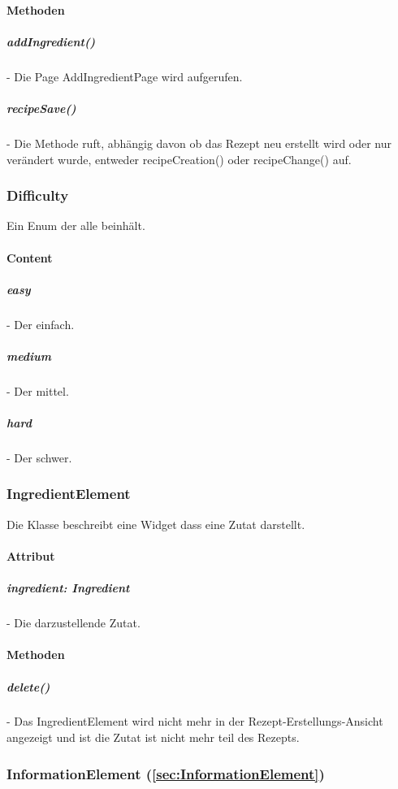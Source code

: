 \documentclass[parskip=full]{scrartcl}
\begin{document}
            \paragraph*{Methoden}
                \subparagraph*{addIngredient()} - Die Page AddIngredientPage wird aufgerufen.
                \subparagraph*{recipeSave()} - Die Methode ruft, abhängig davon ob das Rezept neu erstellt wird oder nur verändert wurde, entweder recipeCreation() oder recipeChange() auf.
        
        \subsubsection{Difficulty}
            Ein Enum der alle  beinhält.
            \paragraph*{Content}
                \subparagraph*{easy} - Der  einfach.
                \subparagraph*{medium} - Der  mittel.
                \subparagraph*{hard} - Der  schwer.

        \subsubsection*{IngredientElement}
            Die Klasse beschreibt eine Widget dass eine Zutat darstellt.
            \paragraph*{Attribut}
                \subparagraph*{ingredient: Ingredient} - Die darzustellende Zutat.

            \paragraph*{Methoden}
                \subparagraph*{delete()} - Das IngredientElement wird nicht mehr in der Rezept-Erstellungs-Ansicht angezeigt und ist die Zutat ist nicht mehr teil des Rezepts.

        \subsubsection*{InformationElement (\autoref{sec:InformationElement})}
\end{document}
